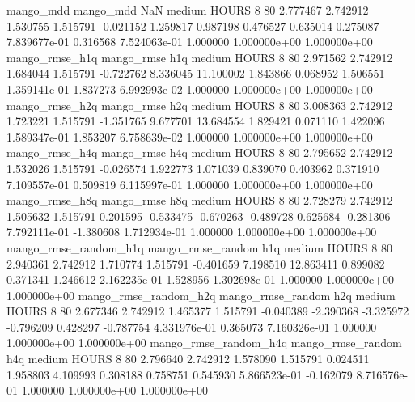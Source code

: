             mango_mdd         mango_mdd                  NaN     medium    HOURS                 8 80  2.777467       2.742912 1.530755       1.515791   -0.021152      1.259817      0.987198     0.476527       0.635014  0.275087 7.839677e-01     0.316568   7.524063e-01            1.000000    1.000000e+00        1.000000e+00
       mango_rmse_h1q        mango_rmse                  h1q     medium    HOURS                 8 80  2.971562       2.742912 1.684044       1.515791   -0.722762      8.336045     11.100002     1.843866       0.068952  1.506551 1.359141e-01     1.837273   6.992993e-02            1.000000    1.000000e+00        1.000000e+00
       mango_rmse_h2q        mango_rmse                  h2q     medium    HOURS                 8 80  3.008363       2.742912 1.723221       1.515791   -1.351765      9.677701     13.684554     1.829421       0.071110  1.422096 1.589347e-01     1.853207   6.758639e-02            1.000000    1.000000e+00        1.000000e+00
       mango_rmse_h4q        mango_rmse                  h4q     medium    HOURS                 8 80  2.795652       2.742912 1.532026       1.515791   -0.026574      1.922773      1.071039     0.839070       0.403962  0.371910 7.109557e-01     0.509819   6.115997e-01            1.000000    1.000000e+00        1.000000e+00
       mango_rmse_h8q        mango_rmse                  h8q     medium    HOURS                 8 80  2.728279       2.742912 1.505632       1.515791    0.201595     -0.533475     -0.670263    -0.489728       0.625684 -0.281306 7.792111e-01    -1.380608   1.712934e-01            1.000000    1.000000e+00        1.000000e+00
mango_rmse_random_h1q mango_rmse_random                  h1q     medium    HOURS                 8 80  2.940361       2.742912 1.710774       1.515791   -0.401659      7.198510     12.863411     0.899082       0.371341  1.246612 2.162235e-01     1.528956   1.302698e-01            1.000000    1.000000e+00        1.000000e+00
mango_rmse_random_h2q mango_rmse_random                  h2q     medium    HOURS                 8 80  2.677346       2.742912 1.465377       1.515791   -0.040389     -2.390368     -3.325972    -0.796209       0.428297 -0.787754 4.331976e-01     0.365073   7.160326e-01            1.000000    1.000000e+00        1.000000e+00
mango_rmse_random_h4q mango_rmse_random                  h4q     medium    HOURS                 8 80  2.796640       2.742912 1.578090       1.515791    0.024511      1.958803      4.109993     0.308188       0.758751  0.545930 5.866523e-01    -0.162079   8.716576e-01            1.000000    1.000000e+00        1.000000e+00
